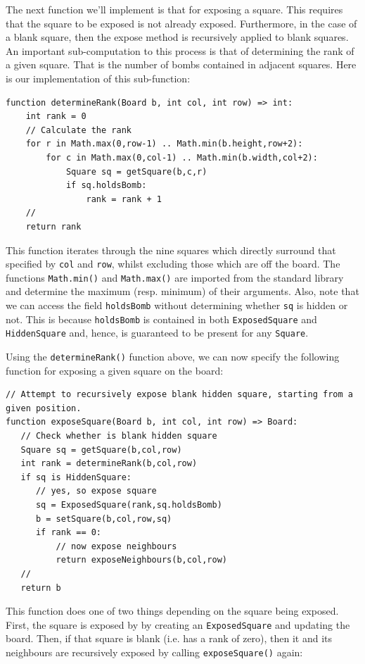 The next function we'll implement is that for exposing a square.  This requires that the square to be exposed is not already exposed.  Furthermore, in the case of a blank square, then the expose method is recursively applied to blank squares.  An important sub-computation to this process is that of determining the rank of a given square.  That is the number of bombs contained in adjacent squares.  Here is our implementation of this sub-function:

\begin{lstlisting}
function determineRank(Board b, int col, int row) => int:
    int rank = 0
    // Calculate the rank
    for r in Math.max(0,row-1) .. Math.min(b.height,row+2):
        for c in Math.max(0,col-1) .. Math.min(b.width,col+2):
            Square sq = getSquare(b,c,r)
            if sq.holdsBomb:
                rank = rank + 1
    //
    return rank
\end{lstlisting}

This function iterates through the nine squares which directly surround that specified by \lstinline{col} and \lstinline{row}, whilst excluding those which are off the board.  The functions \lstinline{Math.min()} and \lstinline{Math.max()} are imported from the standard library and determine the maximum (resp. minimum) of their arguments.  Also, note that we can access the field \lstinline{holdsBomb} without determining whether \lstinline{sq} is hidden or not.  This is because \lstinline{holdsBomb} is contained in both \lstinline{ExposedSquare} and \lstinline{HiddenSquare} and, hence, is guaranteed to be present for any \lstinline{Square}.

Using the \lstinline{determineRank()} function above, we can now specify the following function for exposing a given square on the board:

\begin{lstlisting}
// Attempt to recursively expose blank hidden square, starting from a given position.
function exposeSquare(Board b, int col, int row) => Board:
   // Check whether is blank hidden square
   Square sq = getSquare(b,col,row)
   int rank = determineRank(b,col,row)
   if sq is HiddenSquare:       
      // yes, so expose square
      sq = ExposedSquare(rank,sq.holdsBomb)
      b = setSquare(b,col,row,sq)
      if rank == 0:
          // now expose neighbours
          return exposeNeighbours(b,col,row)
   //
   return b
\end{lstlisting}

This function does one of two things depending on the square being exposed.  First, the square is exposed by by creating an \lstinline{ExposedSquare} and updating the board.  Then, if that square is blank (i.e. has a rank of zero), then it and its neighbours are recursively exposed by calling \lstinline{exposeSquare()} again:

